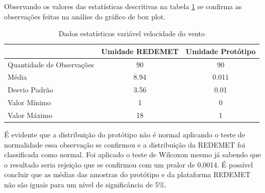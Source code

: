 Observando os valores das estatísticas descritivas na tabela \ref{tab:est_desc_velvento_prot} se confirma as observações feitas na análise do gráfico de box plot.

\begin{table}[]
\centering
\begin{tabular}{l|c|c|}
\cline{2-3}
                                                & \multicolumn{1}{l|}{\textbf{Umidade REDEMET}} & \textbf{Umidade Protótipo} \\ \hline
\multicolumn{1}{|l|}{Quantidade de Observações} & 90                                            & 90                         \\ \hline
\multicolumn{1}{|l|}{Média}                     & 8.94                                          & 0.011                      \\ \hline
\multicolumn{1}{|l|}{Desvio Padrão}             & 3.56                                          & 0.01                       \\ \hline
\multicolumn{1}{|l|}{Valor Mínimo}              & 1                                             & 0                          \\ \hline
\multicolumn{1}{|l|}{Valor Máximo}              & 18                                            & 1                          \\ \hline
\end{tabular}
\caption{Dados estatísticos variável velocidade do vento}
\label{tab:est_desc_velvento_prot}
\end{table}

É evidente que a distribuição do protótipo não é normal aplicando o teste de normalidade essa observação se confirmou e a distribuição da REDEMET foi classificada como normal. Foi aplicado o teste de Wilcoxon mesmo já sabendo que o resultado seria rejeição que se confirmou com um pvalor de 0,0014. É possível concluir que as médias das amostras do protótipo e da plataforma REDEMET não são iguais para um nível de significância de 5\%.

